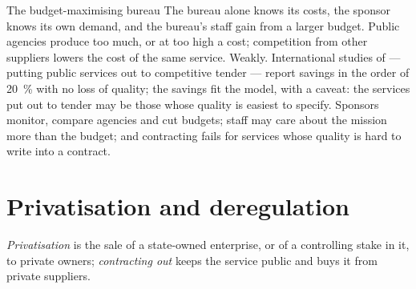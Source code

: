 \begin{omfigure}
\par{}
\end{omfigure}

\begin{model}{The budget-maximising bureau}
\assumes The bureau alone knows its costs, the sponsor knows its own demand, and
the bureau's staff gain from a larger budget.
\predicts Public agencies produce too much, or at too high a cost; competition
from other suppliers lowers the cost of the same service.
\tested Weakly. International studies of  --- putting public services
out to competitive tender --- report savings in the order of 20~\% with no loss of
quality; %
the savings fit the model, with a caveat: the services put out to tender may be
those whose quality is easiest to specify.
\breaks Sponsors monitor, compare agencies and cut budgets; staff may care about
the mission more than the budget; and contracting fails for services whose quality
is hard to write into a contract.
\end{model}

\section{Privatisation and deregulation}\label{sec:b3:interest-groups-and-regulation:privatisation}

\begin{definition}[Privatisation]\label{def:b3:interest-groups-and-regulation:privatisation}
\emph{Privatisation} is the sale of a state-owned enterprise, or of a controlling
stake in it, to private owners; \emph{contracting out} keeps the service public and
buys it from private suppliers.
\end{definition}

